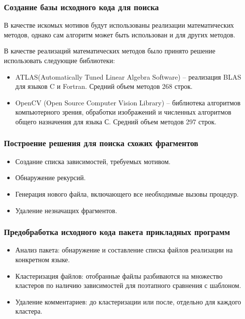 \documentclass{beamer}
\begin{document}
\begin{frame}
\frametitle{Создание базы исходного кода для поиска}
В качестве искомых мотивов будут использованы реализации математических методов,
 однако сам алгоритм может быть использован и для других методов. 

В качестве реализаций математических методов было принято решение использовать
 следующие библиотеки: 
\begin{itemize}
	\item ATLAS(Automatically Tuned Linear Algebra Software) -- реализация BLAS для
	 языков C и Fortran. Средний объем методов 268 строк.
	\item OpenCV (Open Source Computer Vision Library) -- библиотека алгоритмов
	 компьютерного зрения, обработки изображений и численных алгоритмов общего
	  назначения  для языка С. Средний объем методов 297 строк.
\end{itemize}
\end{frame}

\begin{frame}
\frametitle{Построение решения для поиска схожих фрагментов}
\begin{itemize}
	\item Создание списка зависимостей, требуемых мотивом.
	\item Обнаружение рекурсий.
	\item Генерация нового файла, включающего все необходимые вызовы процедур.
	\item Удаление незначащих фрагментов.
\end{itemize}
\end{frame}

\begin{frame}
\frametitle{Предобработка исходного кода пакета прикладных программ}
\begin{itemize}
	\item Анализ пакета: обнаружение и составление списка файлов реализации на
	 конкретном языке.
	\item Кластеризация файлов: отобранные файлы разбиваются на множество кластеров
по наличию зависимостей для поэтапного сравнения с шаблоном.
	\item Удаление комментариев: до кластеризации или после,
отдельно для каждого кластера.
\end{itemize}
\end{frame}
\end{document}
